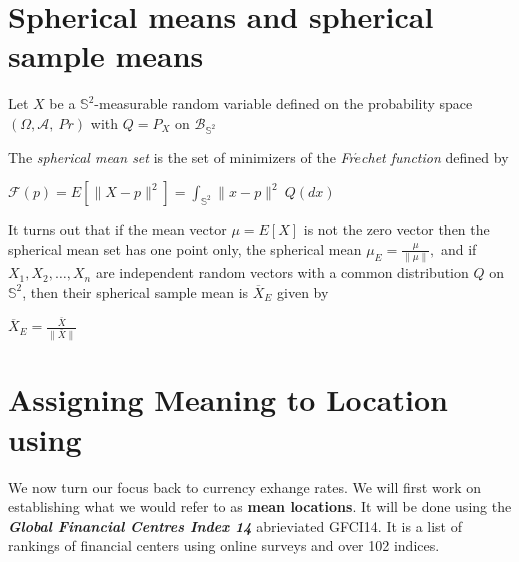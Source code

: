 \documentclass[a0,landscape]{a0poster}
\begin{document}
\begin{multicols}{4}

\section*{ Spherical means and spherical sample means}

 Let $X$  be a $\mathbb S^2$-measurable random variable defined on the probability space $(\Omega, \mathcal{A},~P{r})$ with  $Q = P_{X}$ on $\mathcal{B}_{\mathbb S^2}$

The {\em spherical mean set} is the set of minimizers of the {\em Fr$\acute{e}$chet  function} defined by

\begin{center}
${\mathcal{F}(p)= {E}\left[ \|X - p\|^2 \right] = \int_{\mathbb S^2} \|x - p\|^2~ Q(dx) }$
\end{center}

It turns out that if the mean vector $\mu =  {E}[X]$ is not the zero vector then
the spherical mean set has one point only, the spherical mean $\mu_E = \frac{\mu}{\|\mu\|},$ and if
$X_1,X_2,\dots, X_n$ are independent random vectors with a common distribution $Q$ on $\mathbb{S}^2$, then their spherical sample mean is $\overline{X}_{E}$ given by
\begin{center}
 $\overline{X}_{E} = \frac{\bar X}{\|\bar X\|}$
\end{center}
 \begin{center}
\end{center}




%	

\section*{\color{red}Assigning Meaning to Location using}

{\small We now turn our focus back to currency exhange rates. We will first work on establishing what we would refer to as \textbf{mean locations}. It will be done using the {\em \bf Global Financial Centres Index 14} abrieviated GFCI14. It is a list of rankings of financial centers using online surveys and over 102 indices.}
\begin{center}
\end{center}


\end{multicols}
\end{document}
